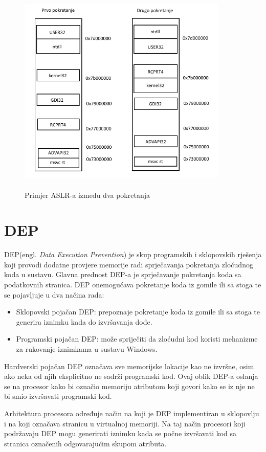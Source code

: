 \documentclass[times, utf8, diplomski, numeric]{fer}
\begin{document}
\begin{figure}[!ht]
\centering
\setlength\fboxsep{0pt}
\setlength\fboxrule{0.5pt}
\includegraphics[width=10cm, height=10cm]{slike/aslr_v2}
\caption{Primjer ASLR-a između dva pokretanja}
\label{fig:aslr} 
\end{figure} 

\section{DEP}
\label{sct:dep}
DEP(engl. \emph{Data Execution Prevention}) je skup programskih i sklopovskih rješenja koji provodi dodatne provjere memorije radi sprječavanja pokretanja zloćudnog koda u sustavu. Glavna prednost DEP-a je sprječavanje pokretanja koda sa podatkovnih stranica. DEP onemogućava pokretanje koda iz gomile ili sa stoga te se pojavljuje u dva načina rada:
\begin{itemize}
\item Sklopovski pojačan DEP: prepoznaje pokretanje koda iz gomile ili sa stoga te generira iznimku kada do izvršavanja dođe.
\item Programski pojačan DEP: može spriječiti da zloćudni kod koristi mehanizme za rukovanje iznimkama u sustavu Windows.
\end{itemize}
Hardverski pojačan DEP označava sve memorijske lokacije kao ne izvršne, osim ako neka od njih eksplicitno ne sadrži programski kod. Ovaj oblik DEP-a oslanja se na procesor kako bi označio memoriju atributom koji govori kako se iz nje ne bi smio izvršavati programski kod.

Arhitektura procesora određuje način na koji je DEP implementiran u sklopovlju i na koji označava stranicu u virtualnoj memoriji. Na taj način procesori koji podržavaju DEP mogu generirati iznimku kada se počne izvršavati kod sa stranica označenih odgovarajućim skupom atributa.
\end{document}
